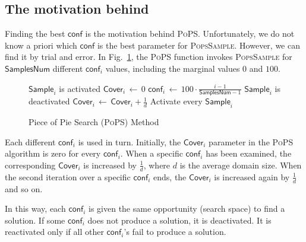 \documentclass{ws-ijait}
\begin{document}
\subsection{The motivation behind \PoPS\label{sampling}}

Finding the best $\mathsf{conf}$ is the motivation behind
\textsc{PoPS}. Unfortunately, we do not know a priori which
$\mathsf{conf}$ is the best parameter for
\textsc{PopsSample}. However, we can find it by trial and
error. In Fig.~\ref{pops}, the \textsc{PoPS} function
invokes \textsc{PopsSample} for $\mathsf{SamplesNum}$
different $\mathsf{conf}_i$ values, including the marginal
values $0$ and $100$.

\begin{figure}
  \centering
  \begin{algorithmic}
        \State $\mathsf{Sample}_i$ is activated
        \State $\mathsf{Cover}_i \, \gets \, 0$
        \State $\mathsf{conf}_i \, \gets \,
                100 \cdot \frac{i - 1}{\mathsf{SamplesNum} - 1}$
      \EndFor
            \State $\mathsf{Sample}_i$ is deactivated
          \EndIf
          \State $\mathsf{Cover}_i \, \gets \,
                  \mathsf{Cover}_i + \frac{1}{d}$
        \EndFor
          \State Activate every $\mathsf{Sample}_i$
        \EndIf
      \EndWhile
    \EndFunction
  \end{algorithmic}
  \caption{Piece of Pie Search ({\normalfont\textsc{PoPS}})
           Method\label{pops}}
\end{figure}

Each different $\mathsf{conf}_i$ is used in turn. Initially,
the $\mathsf{Cover}_i$ parameter in the \textsc{PoPS}
algorithm is zero for every $\mathsf{conf}_i$. When a
specific $\mathsf{conf}_i$ has been examined, the
corresponding $\mathsf{Cover}_i$ is increased by
$\frac{1}{d}$, where $d$ is the average domain size. When
the second iteration over a specific $\mathsf{conf}_i$ ends,
the $\mathsf{Cover}_i$ is increased again by $\frac{1}{d}$
and so on.

In this way, each $\mathsf{conf}_i$ is given the same
opportunity (search space) to find a solution. If some
$\mathsf{conf}_i$ does not produce a solution, it is
deactivated. It is reactivated only if all other
$\mathsf{conf}_i$'s fail to produce a solution.
\end{document}
